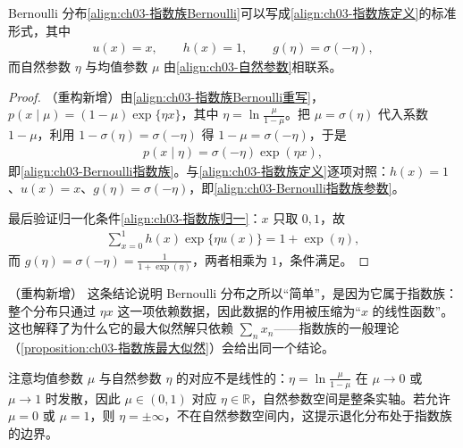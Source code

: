 \documentclass[../../main.tex]{subfiles}
\begin{document}
\begin{proposition}\label{proposition:ch03-Bernoulli指数族}
Bernoulli 分布\eqref{align:ch03-指数族Bernoulli}可以写成\eqref{align:ch03-指数族定义}的标准形式，其中
\begin{align}
u(x)=x,\qquad h(x)=1,\qquad g(\eta)=\sigma(-\eta),
\label{align:ch03-Bernoulli指数族参数}
\end{align}
而自然参数 $\eta$ 与均值参数 $\mu$ 由\eqref{align:ch03-自然参数}相联系。
\end{proposition}
\begin{proof}
（重构新增）由\eqref{align:ch03-指数族Bernoulli重写}，$p(x\mid\mu)=(1-\mu)\exp\{\eta x\}$，其中 $\eta=\ln\frac{\mu}{1-\mu}$。把 $\mu=\sigma(\eta)$ 代入系数 $1-\mu$，利用 $1-\sigma(\eta)=\sigma(-\eta)$ 得 $1-\mu=\sigma(-\eta)$，于是
\begin{align*}
p(x\mid\eta)=\sigma(-\eta)\exp(\eta x),
\end{align*}
即\eqref{align:ch03-Bernoulli指数族}。与\eqref{align:ch03-指数族定义}逐项对照：$h(x)=1$、$u(x)=x$、$g(\eta)=\sigma(-\eta)$，即\eqref{align:ch03-Bernoulli指数族参数}。

最后验证归一化条件\eqref{align:ch03-指数族归一}：$x$ 只取 $0,1$，故
\begin{align*}
\sum_{x=0}^{1}h(x)\exp\{\eta u(x)\}=1+\exp(\eta),
\end{align*}
而 $g(\eta)=\sigma(-\eta)=\frac{1}{1+\exp(\eta)}$，两者相乘为 $1$，条件满足。
\end{proof}

\begin{remark}（重构新增）
这条结论说明 Bernoulli 分布之所以“简单”，是因为它属于指数族：整个分布只通过 $\eta x$ 这一项依赖数据，因此数据的作用被压缩为“$x$ 的线性函数”。这也解释了为什么它的最大似然解只依赖 $\sum_n x_n$——指数族的一般理论（\cref{proposition:ch03-指数族最大似然}）会给出同一个结论。

注意均值参数 $\mu$ 与自然参数 $\eta$ 的对应不是线性的：$\eta=\ln\frac{\mu}{1-\mu}$ 在 $\mu\to0$ 或 $\mu\to1$ 时发散，因此 $\mu\in(0,1)$ 对应 $\eta\in\mathbb{R}$，自然参数空间是整条实轴。若允许 $\mu=0$ 或 $\mu=1$，则 $\eta=\pm\infty$，不在自然参数空间内，这提示退化分布处于指数族的边界。
\end{remark}
\end{document}
